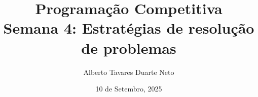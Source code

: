 \documentclass{beamer}
\title{{\Large Programação Competitiva}\\ Semana 4: Estratégias de resolução de problemas}
\date{10 de Setembro, 2025}
\author{Alberto Tavares Duarte Neto}
\institute{Universidade de Brasília}
\numberwithin{equation}{subsection}
\begin{document}
    \maketitle
    \small

    
    
    
    
    
    
    


\end{document}
